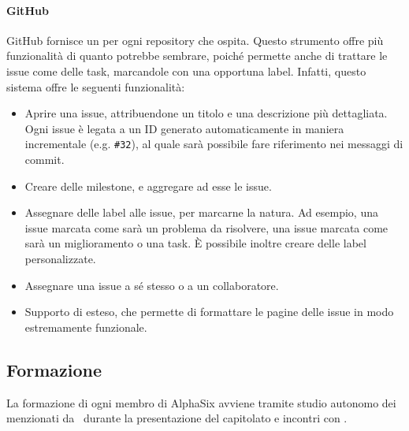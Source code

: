     		\paragraph{GitHub}\label{Github}
			GitHub fornisce un  per ogni repository che ospita. Questo strumento offre più funzionalità di quanto potrebbe sembrare,
			poich\'e permette anche di trattare le issue come delle task, marcandole con una opportuna label. Infatti, questo sistema offre le seguenti funzionalità:
			\begin{itemize}
				\item Aprire una issue, attribuendone un titolo e una descrizione più dettagliata. Ogni issue è legata a un ID generato automaticamente in maniera
					incrementale (e.g. \texttt{\#32}), al quale sarà possibile fare riferimento nei messaggi di commit.
				\item Creare delle milestone, e aggregare ad esse le issue.
				\item Assegnare delle label alle issue, per marcarne la natura. Ad esempio, una issue marcata come  sarà un problema da risolvere, una
					issue marcata come  sarà un miglioramento o una task. È possibile inoltre creare delle label personalizzate.
				\item Assegnare una issue a s\'e stesso o a un collaboratore.
				\item Supporto di  esteso, che permette di
				formattare le pagine delle issue in modo estremamente funzionale.
			\end{itemize}



	\subsection{Formazione}

		La formazione di ogni membro di AlphaSix avviene tramite studio autonomo dei  menzionati da \II\ durante la presentazione del capitolato e incontri con \gruppo.


